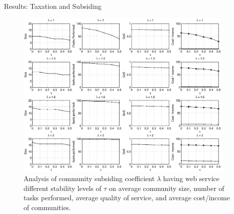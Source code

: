 \documentclass{beamer}
\begin{document}
\begin{frame}{Results: Taxation and Subsiding}
    \begin{figure}[!t]
        \centerline{\includegraphics[width=4.2in]{figures/tax_dyn.eps}}
        \caption{Analysis of community subsiding coefficient $\lambda$
        having web service different stability levels of $\tau$ on average
        community size, number of tasks performed, average quality of
        service, and average cost/income of communities.}
        \label{fig_dynamic_taxtation}
    \end{figure}
\end{frame}
\end{document}
